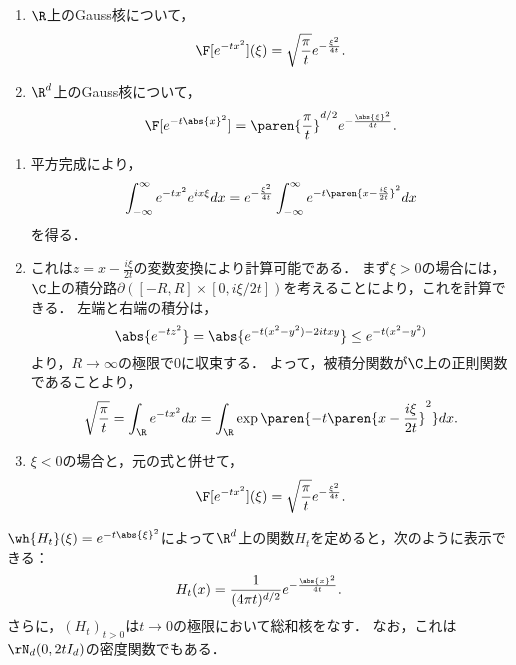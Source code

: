 \documentclass[uplatex,dvipdfmx]{jsreport}
\begin{document}
\begin{theorem}\mbox{}\label{thm-Fourier-transform-of-Gaussian-density}
    \begin{enumerate}
        \item $\R$上のGauss核について，\[\F[e^{-tx^2}](\xi)=\sqrt{\frac{\pi}{t}}e^{-\frac{\xi^2}{4t}}.\]
        \item $\R^d$上のGauss核について，
        \[\F[e^{-t\abs{x}^2}]=\paren{\frac{\pi}{t}}^{d/2}e^{-\frac{\abs{\xi}^2}{4t}}.\]
    \end{enumerate}
\end{theorem}
\begin{Proof}\mbox{}
    \begin{enumerate}[{Step}1]
        \item 平方完成により，
        \begin{align*}
            \int^\infty_{-\infty}e^{-tx^2}e^{ix\xi}dx=e^{-\frac{\xi^2}{4t}}\int^\infty_{-\infty}e^{-t\paren{x-\frac{i\xi}{2t}}^2}dx
        \end{align*}
        を得る．
        \item これは$z=x-\frac{i\xi}{2t}$の変数変換により計算可能である．
        まず$\xi>0$の場合には，
        $\C$上の積分路$\partial([-R,R]\times[0,i\xi/2t])$を考えることにより，これを計算できる．
        左端と右端の積分は，
        \[\abs{e^{-tz^2}}=\abs{e^{-t(x^2-y^2)-2itxy}}\le e^{-t(x^2-y^2)}\]
        より，$R\to\infty$の極限で$0$に収束する．
        よって，被積分関数が$\C$上の正則関数であることより，
        \[\sqrt{\frac{\pi}{t}}=\int_\R e^{-tx^2}dx=\int_\R \exp\paren{-t\paren{x-\frac{i\xi}{2t}}^2}dx.\]
        \item $\xi<0$の場合と，元の式と併せて，
        \[\F[e^{-tx^2}](\xi)=\sqrt{\frac{\pi}{t}}e^{-\frac{\xi^2}{4t}}.\]
    \end{enumerate}
\end{Proof}

\begin{theorem}[上半平面上の熱核]
    $\wh{H_t}(\xi)=e^{-t\abs{\xi}^2}$によって$\R^d$上の関数$H_t$を定めると，次のように表示できる：
    \[H_t(x)=\frac{1}{(4\pi t)^{d/2}}e^{-\frac{\abs{x}^2}{4t}}.\]
    さらに，$(H_t)_{t>0}$は$t\to0$の極限において総和核をなす．
    なお，これは$\rN_d(0,2tI_d)$の密度関数でもある．
\end{theorem}
\end{document}
